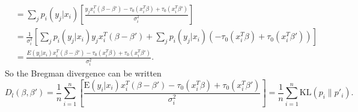 \documentclass[12pt]{article}
\newcommand{\E}{\mathrm{E}}
\begin{document}
\begin{enumerate}
\begin{align*}
&= \sum_j p_i(y_j | x_i) \left[\frac{y_j x_i^T (\beta - \beta') - \tau_0(x_i^T \beta) + \tau_0(x_i^T \beta')}{\sigma_i^2}\right] \\
&= \frac{1}{\sigma_i^2} \left[\sum_j p_i(y_j | x_i) y_j x_i^T (\beta - \beta') + \sum_j p_i(y_j | x_i) (-\tau_0(x_i^T \beta) + \tau_0(x_i^T \beta'))\right] \\
&= \frac{E(y_i | x_i) x_i^T (\beta - \beta') - \tau_0(x_i^T \beta) + \tau_0(x_i^T \beta')}{\sigma_i^2}.
\end{align*}
So the Bregman divergence can be written
\begin{equation*}
D_l(\beta, \beta') = \frac{1}{n} \sum_{i=1}^n \left[\frac{\E(y_i | x_i) x_i^T (\beta - \beta') - \tau_0(x_i^T \beta) + \tau_0(x_i^T \beta')}{\sigma_i^2}\right] = \frac{1}{n} \sum_{i=1}^n \mathrm{KL}(p_i \parallel p'_i).
\end{equation*}

\end{enumerate}
\end{document}

